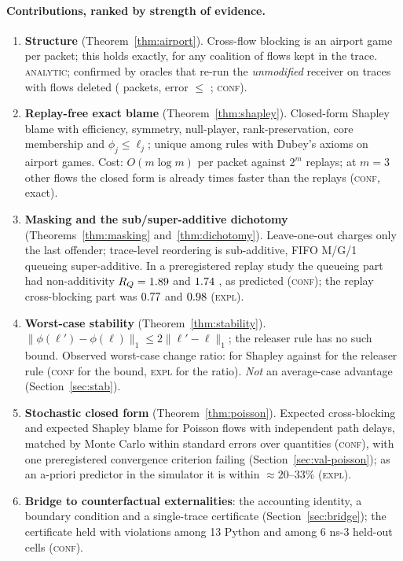 \documentclass[11pt]{article}
\newcommand{\tagC}{\textsc{conf}}
\newcommand{\tagE}{\textsc{expl}}
\newcommand{\tagA}{\textsc{analytic}}
\theoremstyle{definition}
\begin{document}
\paragraph{Contributions, ranked by strength of evidence.}
\begin{enumerate}
  \item \textbf{Structure} (Theorem~\ref{thm:airport}). Cross-flow blocking is an airport game per packet; this holds exactly, for any coalition of flows kept in the trace. \tagA{}; confirmed by oracles that re-run the \emph{unmodified} receiver on traces with flows deleted (\FvODoublePackets{} packets, error $\le$ \FvMaxErr{}; \tagC{}).
  \item \textbf{Replay-free exact blame} (Theorem~\ref{thm:shapley}). Closed-form Shapley blame with efficiency, symmetry, null-player, rank-preservation, core membership and $\phi_j\le\ell_j$; unique among rules with Dubey's axioms on airport games. Cost: $O(m\log m)$ per packet against $2^{m}$ replays; at $m=3$ other flows the closed form is already \FvCostRatio{} times faster than the replays (\tagC{}, exact).
  \item \textbf{Masking and the sub/super-additive dichotomy} (Theorems~\ref{thm:masking} and~\ref{thm:dichotomy}). Leave-one-out charges only the last offender; trace-level reordering is sub-additive, FIFO M/G/1 queueing super-additive. In a preregistered replay study the queueing part had non-additivity $R_Q=1.89{}$ \FvRQACI{} and $1.74{}$ \FvRQBCI{}, as predicted (\tagC{}); the replay cross-blocking part was $0.77{}$ \FvRXACI{} and $0.98{}$ \FvRXBCI{} (\tagE{}).
  \item \textbf{Worst-case stability} (Theorem~\ref{thm:stability}). $\|\phi(\ell')-\phi(\ell)\|_1\le2\|\ell'-\ell\|_1$; the releaser rule has no such bound. Observed worst-case change ratio: \FvRatioSh{} for Shapley against \FvRatioRel{} for the releaser rule (\tagC{} for the bound, \tagE{} for the ratio). \emph{Not} an average-case advantage (Section~\ref{sec:stab}).
  \item \textbf{Stochastic closed form} (Theorem~\ref{thm:poisson}). Expected cross-blocking and expected Shapley blame for Poisson flows with independent path delays, matched by Monte Carlo within \FvMaxZ{} standard errors over \FvNQuant{} quantities (\tagC{}), with one preregistered convergence criterion failing (Section~\ref{sec:val-poisson}); as an a-priori predictor in the simulator it is within $\approx\!20$--$33\%$ (\tagE{}).
  \item \textbf{Bridge to counterfactual externalities}: the accounting identity, a boundary condition and a single-trace certificate (Section~\ref{sec:bridge}); the certificate held with \FourPyViol{} violations among 13 Python and \FourNsViol{} among 6 ns-3 held-out cells (\tagC{}).
\end{enumerate}
\end{document}
